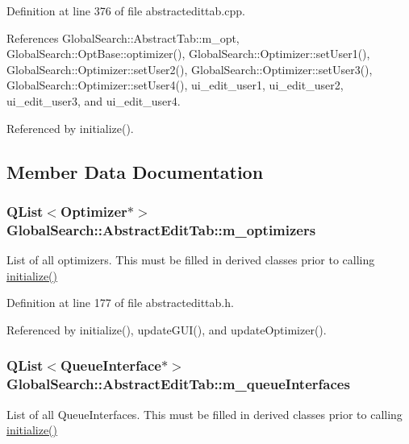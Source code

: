 Definition at line 376 of file abstractedittab.\-cpp.



References Global\-Search\-::\-Abstract\-Tab\-::m\-\_\-opt, Global\-Search\-::\-Opt\-Base\-::optimizer(), Global\-Search\-::\-Optimizer\-::set\-User1(), Global\-Search\-::\-Optimizer\-::set\-User2(), Global\-Search\-::\-Optimizer\-::set\-User3(), Global\-Search\-::\-Optimizer\-::set\-User4(), ui\-\_\-edit\-\_\-user1, ui\-\_\-edit\-\_\-user2, ui\-\_\-edit\-\_\-user3, and ui\-\_\-edit\-\_\-user4.



Referenced by initialize().



\subsection{Member Data Documentation}
\hypertarget{classGlobalSearch_1_1AbstractEditTab_a91f1cbcdf3321b4502aaa11074559eba}{
\subsubsection[{m\-\_\-optimizers}]{\setlength{\rightskip}{0pt plus 5cm}Q\-List$<${\bf Optimizer}$\ast$$>$ Global\-Search\-::\-Abstract\-Edit\-Tab\-::m\-\_\-optimizers\hspace{0.3cm}{\ttfamily [protected]}}}\label{classGlobalSearch_1_1AbstractEditTab_a91f1cbcdf3321b4502aaa11074559eba}
List of all optimizers. This must be filled in derived classes prior to calling \hyperlink{classGlobalSearch_1_1AbstractEditTab_afb9fd8fbcf71d7287a8117ce4d75a00b}{initialize()} 

Definition at line 177 of file abstractedittab.\-h.



Referenced by initialize(), update\-G\-U\-I(), and update\-Optimizer().

\hypertarget{classGlobalSearch_1_1AbstractEditTab_a364845072bfc0409a145c1cd6b60a60a}{
\subsubsection[{m\-\_\-queue\-Interfaces}]{\setlength{\rightskip}{0pt plus 5cm}Q\-List$<${\bf Queue\-Interface}$\ast$$>$ Global\-Search\-::\-Abstract\-Edit\-Tab\-::m\-\_\-queue\-Interfaces\hspace{0.3cm}{\ttfamily [protected]}}}\label{classGlobalSearch_1_1AbstractEditTab_a364845072bfc0409a145c1cd6b60a60a}
List of all Queue\-Interfaces. This must be filled in derived classes prior to calling \hyperlink{classGlobalSearch_1_1AbstractEditTab_afb9fd8fbcf71d7287a8117ce4d75a00b}{initialize()} 

